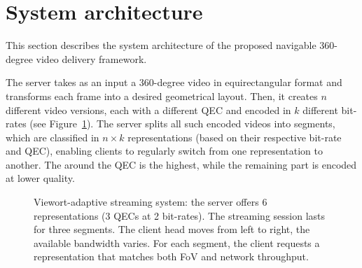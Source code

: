 \section{System architecture}

%    

This section describes the system architecture of the proposed
navigable 360-degree video delivery framework.

The server takes as an input a 360-degree video in
equirectangular format and transforms each frame into a desired
geometrical layout. Then, it creates $n$ different video
versions, each with a different \ac{QEC} and encoded in $k$ different
bit-rates (see Figure~\ref{fig:newdelivery}). The server
splits all such encoded videos into segments, which are classified in
$n\!\times\!k$ representations (based on their respective bit-rate and
\ac{QEC}), enabling clients to regularly switch from one
representation to another. The  around the
\ac{QEC} is the highest, while the remaining part is encoded at lower
quality.

\begin{figure}
   \centering
   
   \caption{Viewort-adaptive streaming system: the server offers \num{6} representations (\num{3} \acp{QEC} at \num{2} bit-rates). The streaming session lasts for three segments. The client head moves from left to right, the available bandwidth varies. For each segment, the client requests a representation that matches both  \ac{FoV} and network throughput.}
   \label{fig:newdelivery}
\end{figure}

